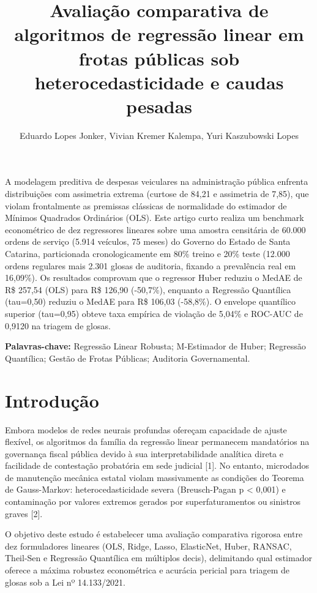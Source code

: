 \documentclass[12pt,a4paper]{article}
\title{\textbf{Avaliação comparativa de algoritmos de regressão linear em frotas públicas sob heterocedasticidade e caudas pesadas}}
\author{Eduardo Lopes Jonker\inst{1}, Vivian Kremer Kalempa\inst{1}, Yuri Kaszubowski Lopes\inst{1}}
\begin{document}
\maketitle

\begin{resumo}
A modelagem preditiva de despesas veiculares na administração pública enfrenta distribuições com assimetria extrema (curtose de 84,21 e assimetria de 7,85), que violam frontalmente as premissas clássicas de normalidade do estimador de Mínimos Quadrados Ordinários (OLS). Este artigo curto realiza um benchmark econométrico de dez regressores lineares sobre uma amostra censitária de 60.000 ordens de serviço (5.914 veículos, 75 meses) do Governo do Estado de Santa Catarina, particionada cronologicamente em 80\% treino e 20\% teste (12.000 ordens regulares mais 2.301 glosas de auditoria, fixando a prevalência real em 16,09\%). Os resultados comprovam que o regressor Huber reduziu o MedAE de R\$ 257,54 (OLS) para R\$ 126,90 (-50,7\%), enquanto a Regressão Quantílica (tau=0,50) reduziu o MedAE para R\$ 106,03 (-58,8\%). O envelope quantílico superior (tau=0,95) obteve taxa empírica de violação de 5,04\% e ROC-AUC de 0,9120 na triagem de glosas.

\vspace{0.2cm}
\noindent\textbf{Palavras-chave:} Regressão Linear Robusta; M-Estimador de Huber; Regressão Quantílica; Gestão de Frotas Públicas; Auditoria Governamental.
\end{resumo}



\section{Introdução}

Embora modelos de redes neurais profundas ofereçam capacidade de ajuste flexível, os algoritmos da família da regressão linear permanecem mandatórios na governança fiscal pública devido à sua interpretabilidade analítica direta e facilidade de contestação probatória em sede judicial [1]. No entanto, microdados de manutenção mecânica estatal violam massivamente as condições do Teorema de Gauss-Markov: heterocedasticidade severa (Breusch-Pagan p < 0,001) e contaminação por valores extremos gerados por superfaturamentos ou sinistros graves [2].

O objetivo deste estudo é estabelecer uma avaliação comparativa rigorosa entre dez formuladores lineares (OLS, Ridge, Lasso, ElasticNet, Huber, RANSAC, Theil-Sen e Regressão Quantílica em múltiplos decis), delimitando qual estimador oferece a máxima robustez econométrica e acurácia pericial para triagem de glosas sob a Lei nº 14.133/2021.
\end{document}
